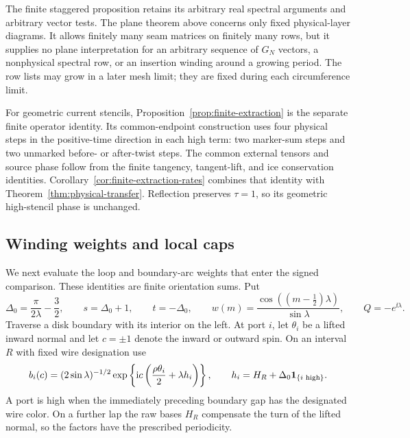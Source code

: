 The finite staggered proposition retains its arbitrary real spectral
arguments and arbitrary vector tests.  The plane theorem above concerns
only fixed physical-layer diagrams.  It allows finitely many seam matrices
on finitely many rows, but it supplies no plane interpretation for an
arbitrary sequence of \(G_N\) vectors, a nonphysical spectral row, or an
insertion winding around a growing period.  The row lists may grow in a
later mesh limit; they are fixed during each circumference limit.

For geometric current stencils, Proposition~\ref{prop:finite-extraction}
is the separate finite operator identity.  Its common-endpoint construction
uses four physical steps in the positive-time direction in each high term:
two marker-sum steps
and two unmarked before- or after-twist steps.  The common external tensors
and source phase follow from the finite tangency, tangent-lift, and ice
conservation identities.  Corollary~\ref{cor:finite-extraction-rates}
combines that identity with Theorem~\ref{thm:physical-transfer}.  Reflection
preserves \(\tau=1\), so its geometric high-stencil phase is unchanged.

\subsection{Winding weights and local caps}

We next evaluate the loop and boundary-arc weights that enter the
signed comparison. These identities are finite orientation sums. Put
\begin{equation}\label{physical:charges}
 \Delta_0=\frac{\pi}{2\lambda}-\frac32,\qquad
 s=\Delta_0+1,\qquad t=-\Delta_0,\qquad
 w(m)=\frac{\cos((m-\tfrac12)\lambda)}{\sin\lambda},\qquad
 Q=-e^{\ii\lambda}.
\end{equation}
Traverse a disk boundary with its interior on the left. At port \(i\),
let \(\theta_i\) be a lifted inward normal and let \(c=\pm1\)
denote the inward or outward spin. On an interval \(R\) with fixed
wire designation use
\begin{equation}\label{physical:boundary-factors}
 b_i(c)=(2\sin\lambda)^{-1/2}
 \exp\left\{\mathrm i c\left(\frac{\rho\theta_i}{2}+\lambda h_i\right)\right\},
 \qquad h_i=H_R+\Delta_0\mathbf 1_{\{i\text{ high}\}}.
\end{equation}
A port is high when the immediately preceding boundary gap has the
designated wire color. On a further lap the raw bases \(H_R\)
compensate the turn of the lifted normal, so the factors have the
prescribed periodicity.

